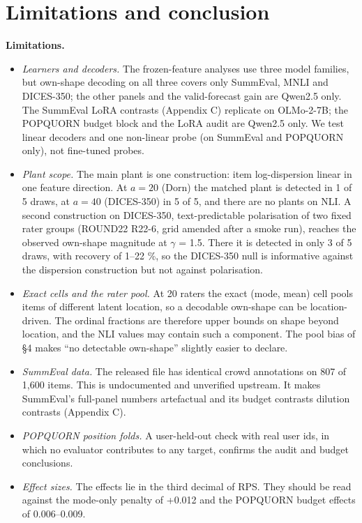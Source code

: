 \documentclass{article}
\providecommand{\tightlist}{\setlength{\itemsep}{0pt}\setlength{\parskip}{0pt}}
\begin{document}
\section{Limitations and conclusion}

\textbf{Limitations.}

\begin{itemize}
\tightlist
\item
  \emph{Learners and decoders.} The frozen-feature analyses use three model families, but own-shape decoding on all three covers only SummEval, MNLI and DICES-350; the other panels and the valid-forecast gain are Qwen2.5 only. The SummEval LoRA contrasts (Appendix C) replicate on OLMo-2-7B; the POPQUORN budget block and the LoRA audit are Qwen2.5 only. We test linear decoders and one non-linear probe (on SummEval and POPQUORN only), not fine-tuned probes.
\item
  \emph{Plant scope.} The main plant is one construction: item log-dispersion linear in one feature direction. At \(a=20\) (Dorn) the matched plant is detected in 1 of 5 draws, at \(a=40\) (DICES-350) in 5 of 5, and there are no plants on NLI. A second construction on DICES-350, text-predictable polarisation of two fixed rater groups (ROUND22 R22-6, grid amended after a smoke run), reaches the observed own-shape magnitude at $\gamma$ = 1.5. There it is detected in only 3 of 5 draws, with recovery of 1--22 \%, so the DICES-350 null is informative against the dispersion construction but not against polarisation.
\item
  \emph{Exact cells and the rater pool.} At 20 raters the exact (mode, mean) cell pools items of different latent location, so a decodable own-shape can be location-driven. The ordinal fractions are therefore upper bounds on shape beyond location, and the NLI values may contain such a component. The pool bias of \S{}4 makes ``no detectable own-shape'' slightly easier to declare.
\item
  \emph{SummEval data.} The released file has identical crowd annotations on 807 of 1,600 items. This is undocumented and unverified upstream. It makes SummEval's full-panel numbers artefactual and its budget contrasts dilution contrasts (Appendix C).
\item
  \emph{POPQUORN position folds.} A user-held-out check with real user ids, in which no evaluator contributes to any target, confirms the audit and budget conclusions.
\item
  \emph{Effect sizes.} The effects lie in the third decimal of RPS. They should be read against the mode-only penalty of +0.012 and the POPQUORN budget effects of 0.006--0.009.
\end{itemize}
\end{document}
